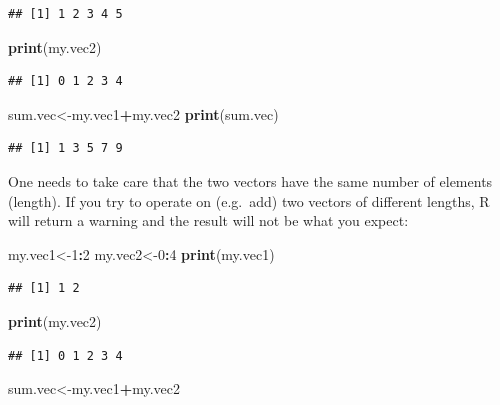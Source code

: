 \documentclass[
]{book}
\newenvironment{Shaded}{\begin{snugshade}}{\end{snugshade}}
\newcommand{\DecValTok}[1]{\textcolor[rgb]{0.00,0.00,0.81}{#1}}
\newcommand{\KeywordTok}[1]{\textcolor[rgb]{0.13,0.29,0.53}{\textbf{#1}}}
\newcommand{\NormalTok}[1]{#1}
\newcommand{\OperatorTok}[1]{\textcolor[rgb]{0.81,0.36,0.00}{\textbf{#1}}}
\begin{document}
\begin{verbatim}
## [1] 1 2 3 4 5
\end{verbatim}

\begin{Shaded}
\begin{Highlighting}[]
\KeywordTok{print}\NormalTok{(my.vec2)}
\end{Highlighting}
\end{Shaded}

\begin{verbatim}
## [1] 0 1 2 3 4
\end{verbatim}

\begin{Shaded}
\begin{Highlighting}[]
\NormalTok{sum.vec\textless{}{-}my.vec1}\OperatorTok{+}\NormalTok{my.vec2}
\KeywordTok{print}\NormalTok{(sum.vec)}
\end{Highlighting}
\end{Shaded}

\begin{verbatim}
## [1] 1 3 5 7 9
\end{verbatim}

One needs to take care that the two vectors have the same number of elements (length). If you try to operate on (e.g.~add) two vectors of different lengths, R will return a warning and the result will not be what you expect:

\begin{Shaded}
\begin{Highlighting}[]
\NormalTok{my.vec1\textless{}{-}}\DecValTok{1}\OperatorTok{:}\DecValTok{2}
\NormalTok{my.vec2\textless{}{-}}\DecValTok{0}\OperatorTok{:}\DecValTok{4}
\KeywordTok{print}\NormalTok{(my.vec1)}
\end{Highlighting}
\end{Shaded}

\begin{verbatim}
## [1] 1 2
\end{verbatim}

\begin{Shaded}
\begin{Highlighting}[]
\KeywordTok{print}\NormalTok{(my.vec2)}
\end{Highlighting}
\end{Shaded}

\begin{verbatim}
## [1] 0 1 2 3 4
\end{verbatim}

\begin{Shaded}
\begin{Highlighting}[]
\NormalTok{sum.vec\textless{}{-}my.vec1}\OperatorTok{+}\NormalTok{my.vec2}
\end{Highlighting}
\end{Shaded}
\end{document}
